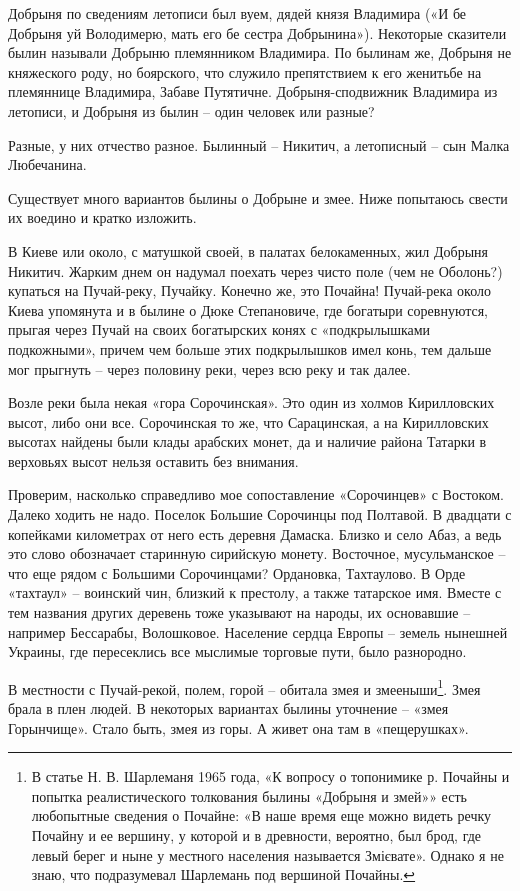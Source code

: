 Добрыня по сведениям летописи был вуем, дядей князя Владимира («И бе Добрыня уй Володимерю, мать его бе сестра Добрынина»). Некоторые сказители былин называли Добрыню племянником Владимира. По былинам же, Добрыня не княжеского роду, но боярского, что служило препятствием к его женитьбе на племяннице Владимира, Забаве Путятичне. Добрыня-сподвижник Владимира из летописи, и Добрыня из былин – один человек или разные?

Разные, у них отчество разное. Былинный – Никитич, а летописный – сын Малка Любечанина.

Существует много вариантов былины о Добрыне и змее. Ниже попытаюсь свести их воедино и кратко изложить.

В Киеве или около, с матушкой своей, в палатах белокаменных, жил Добрыня Никитич. Жарким днем он надумал поехать через чисто поле (чем не Оболонь?) купаться на Пучай-реку, Пучайку. Конечно же, это Почайна! Пучай-река около Киева упомянута и в былине о Дюке Степановиче, где богатыри соревнуются, прыгая через Пучай на своих богатырских конях с «подкрылышками подкожными», причем чем больше этих подкрылышков имел конь, тем дальше мог прыгнуть – через половину реки, через всю реку и так далее.

Возле реки была некая «гора Сорочинская». Это один из холмов Кирилловских высот, либо они все. Сорочинская то же, что Сарацинская, а на Кирилловских высотах найдены были клады арабских монет, да и наличие района Татарки в верховьях высот нельзя оставить без внимания. 

Проверим, насколько справедливо мое сопоставление «Сорочинцев» с Востоком. Далеко ходить не надо. Поселок Большие Сорочинцы под Полтавой. В двадцати с копейками километрах от него есть деревня Дамаска. Близко и село Абаз, а ведь это слово обозначает старинную сирийскую монету. Восточное, мусульманское – что еще рядом с Большими Сорочинцами? Ордановка, Тахтаулово. В Орде «тахтаул» – воинский чин, близкий к престолу, а также татарское имя. Вместе с тем названия других деревень тоже указывают на народы, их основавшие – например Бессарабы, Волошковое. Население сердца Европы – земель нынешней Украины, где пересеклись все мыслимые торговые пути, было разнородно.

В местности с Пучай-рекой, полем, горой – обитала змея и змееныши\footnote{В статье Н. В. Шарлеманя 1965 года, «К вопросу о топонимике р. Почайны и попытка реалистического толкования былины «Добрыня и змей»» есть любопытные сведения о Почайне: «В наше время еще можно видеть речку Почайну и ее вершину, у которой и в древности, вероятно, был брод, где левый берег и ныне у местного населения называется Змієвате». Однако я не знаю, что подразумевал Шарлемань под вершиной Почайны.}. Змея брала в плен людей. В некоторых вариантах былины уточнение – «змея Горынчище». Стало быть, змея из горы. А живет она там в «пещерушках».

